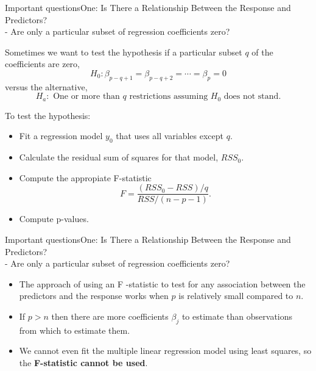\begin{frame}{Important questions}{One: Is There a Relationship Between the Response and Predictors? \\ - Are only a particular subset of regression coefficients zero?}

Sometimes we want to test the hypothesis if a particular subset $q$ of the coeﬃcients are zero, \pause
$$H_0: \beta_{p-q+1} = \beta_{p-q+2} = \cdots = \beta_p = 0$$ \pause
versus the alternative, \pause
$$H_a: \text{ One or more than } q \text{ restrictions assuming } H_0 \text{ does not stand}. $$  \pause

To test the hypothesis: \pause
\begin{itemize}
    \item Fit a regression model $y_0$ that uses all variables except $q$. \pause
    \item Calculate the residual sum of squares for that model, $RSS_0$. \pause
    \item Compute the appropiate F-statistic
    $$F = \frac{(RSS_0 - RSS)/q}{RSS/(n-p-1)}.$$ \pause
    \item Compute p-values.
    
\end{itemize}



\end{frame}

\begin{frame}{Important questions}{One: Is There a Relationship Between the Response and Predictors? \\ - Are only a particular subset of regression coefficients zero?}

    \begin{itemize}
        \item The approach of using an F -statistic to test for any association between the predictors and the response works when $p$ is relatively small compared to $n$. \pause
        \item If $p > n$ then there are more coeﬃcients $\beta_j$ to estimate than observations from which to estimate them. \pause
        \item We cannot even fit the multiple linear regression model using least squares, so the \textbf{F-statistic cannot be used}. 
    \end{itemize}

    
\end{frame}


